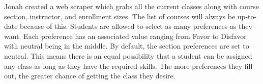 Jonah created a web scraper which grabs all the current classes along with course section, instructor, and enrollment sizes.
The list of courses will always be up-to-date because of this.
Students are allowed to select as many preferences as they want.
Each preference has an associated value ranging from Favor to Disfavor with neutral being in the middle.
By default, the section preferences are set to neutral.
This means there is an equal possibility that a student can be assigned any class as long as they have the required skills.
The more preferences they fill out, the greater chance of getting the class they desire.
